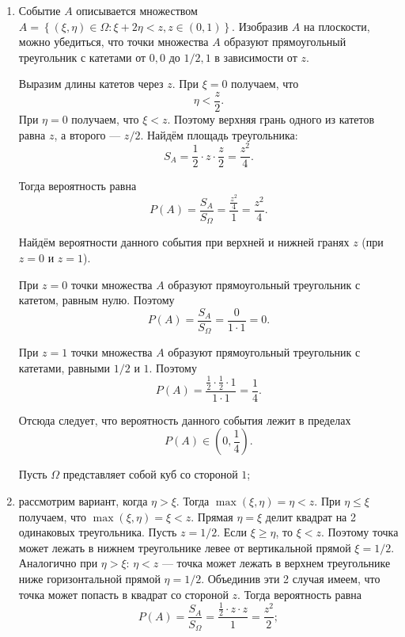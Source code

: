 \begin{enumerate}[label=\alph*)]
\item Событие $A$ описывается множеством
$A =
\left\{ \left( \xi, \eta \right) \in \Omega:
\xi + 2 \eta < z, z \in \left( 0, 1 \right) \right\}$.
Изобразив $A$ на плоскости, можно убедиться,
что точки множества $A$ образуют прямоугольный треугольник с катетами от $0, 0$ до $1/2, 1$ в зависимости от $z$.

Выразим длины катетов через $z$.
При $ \xi = 0$ получаем, что
$$ \eta < \frac{z}{2}.$$
При $ \eta = 0$ получаем, что $ \xi < z$.
Поэтому верхняя грань одного из катетов равна $z$, а второго --- $z/2$.
Найдём площадь треугольника:
$$S_A =
\frac{1}{2} \cdot z \cdot \frac{z}{2} =
\frac{z^2}{4}.$$

Тогда вероятность равна
$$P \left( A \right) =
\frac{S_A}{S_{ \Omega }} =
\frac{ \frac{z^2}{4} }{1} =
\frac{z^2}{4}.$$

Найдём вероятности данного события при верхней и нижней гранях $z$ (при $z=0$ и $z=1$).

При $z=0$ точки множества $A$ образуют прямоугольный треугольник с катетом, равным нулю.
Поэтому
$$P \left( A \right) =
\frac{S_A}{S_{ \Omega }} =
\frac{0}{1 \cdot 1} =
0.$$

При $z=1$ точки множества $A$ образуют прямоугольный треугольник с катетами, равными $1/2$ и $1$.
Поэтому
$$P \left( A \right) =
\frac{ \frac{1}{2} \cdot \frac{1}{2} \cdot 1}{1 \cdot 1} =
\frac{1}{4}.$$

Отсюда следует, что вероятность данного события лежит в пределах
$$P \left( A \right) \in \left( 0, \frac{1}{4} \right).$$

Пусть $ \Omega $ представляет собой куб со стороной $1$;

\item рассмотрим вариант, когда $ \eta > \xi $.
Тогда $ \max \left( \xi, \eta \right) = \eta < z$.
При $ \eta \leq \xi $ получаем, что $ \max \left( \xi, \eta \right) = \xi < z$.
Прямая $ \eta = \xi $ делит квадрат на 2 одинаковых треугольника.
Пусть $z = 1/2$.
Если $ \xi \geq \eta $, то $ \xi < z$.
Поэтому точка может лежать в нижнем треугольнике левее от вертикальной прямой $ \xi = 1/2$.
Аналогично при $ \eta > \xi : \, \eta < z$ --- точка может лежать в верхнем треугольнике ниже горизонтальной прямой $ \eta = 1/2$.
Объединив эти 2 случая имеем, что точка может попасть в квадрат со стороной $z$.
Тогда вероятность равна
$$P \left( A \right) =
\frac{S_A}{S_{ \Omega }} =
\frac{ \frac{1}{2} \cdot z \cdot z}{1} =
\frac{z^2}{2};$$


\end{enumerate}
